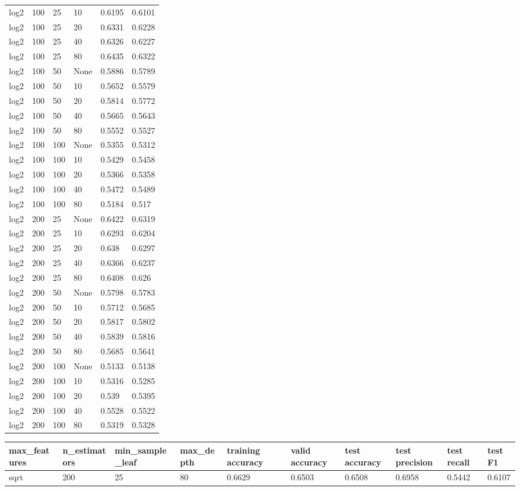 \documentclass{article}%
\begin{document}
\begin{longtable}{l l l l l l}
log2&100&25&10&0.6195&0.6101\\%
log2&100&25&20&0.6331&0.6228\\%
log2&100&25&40&0.6326&0.6227\\%
log2&100&25&80&0.6435&0.6322\\%
log2&100&50&None&0.5886&0.5789\\%
log2&100&50&10&0.5652&0.5579\\%
log2&100&50&20&0.5814&0.5772\\%
log2&100&50&40&0.5665&0.5643\\%
log2&100&50&80&0.5552&0.5527\\%
log2&100&100&None&0.5355&0.5312\\%
log2&100&100&10&0.5429&0.5458\\%
log2&100&100&20&0.5366&0.5358\\%
log2&100&100&40&0.5472&0.5489\\%
log2&100&100&80&0.5184&0.517\\%
log2&200&25&None&0.6422&0.6319\\%
log2&200&25&10&0.6293&0.6204\\%
log2&200&25&20&0.638&0.6297\\%
log2&200&25&40&0.6366&0.6237\\%
log2&200&25&80&0.6408&0.626\\%
log2&200&50&None&0.5798&0.5783\\%
log2&200&50&10&0.5712&0.5685\\%
log2&200&50&20&0.5817&0.5802\\%
log2&200&50&40&0.5839&0.5816\\%
log2&200&50&80&0.5685&0.5641\\%
log2&200&100&None&0.5133&0.5138\\%
log2&200&100&10&0.5316&0.5285\\%
log2&200&100&20&0.539&0.5395\\%
log2&200&100&40&0.5528&0.5522\\%
log2&200&100&80&0.5319&0.5328\\%
\hline%
\end{longtable}%
\begin{longtable}{l l l l l l l l l l}%
\hline%
max\_features&n\_estimators&min\_sample\_leaf&max\_depth&training accuracy&valid accuracy&test accuracy&test precision&test recall&test F1\\%
\hline%
\endhead%
\hline%
sqrt&200&25&80&0.6629&0.6503&0.6508&0.6958&0.5442&0.6107\\%
\hline%
\end{longtable}%
\end{document}
